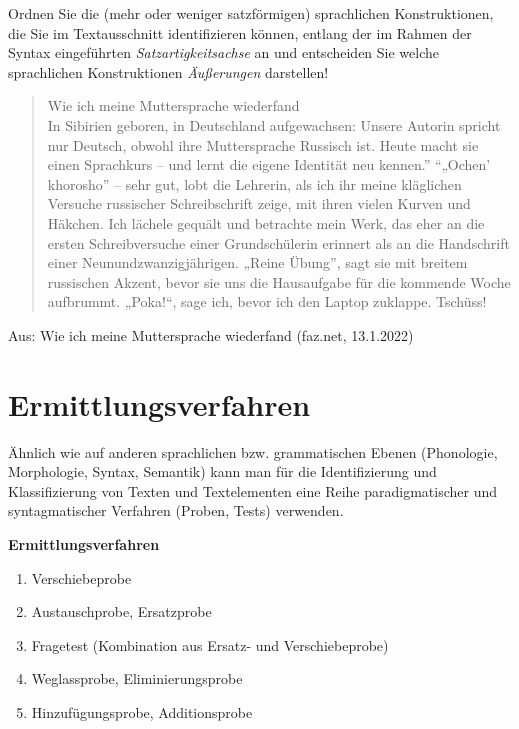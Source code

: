 \documentclass[
  letterpaper,
]{scrbook}
\providecommand{\tightlist}{%
  \setlength{\itemsep}{0pt}\setlength{\parskip}{0pt}}\usepackage{longtable,booktabs,array}
\begin{document}
Ordnen Sie die (mehr oder weniger satzförmigen) sprachlichen
Konstruktionen, die Sie im Textausschnitt identifizieren können, entlang
der im Rahmen der Syntax eingeführten \emph{Satzartigkeitsachse} an und
entscheiden Sie welche sprachlichen Konstruktionen \emph{Äußerungen}
darstellen!

\begin{quote}
Wie ich meine Muttersprache wiederfand\\
In Sibirien geboren, in Deutschland aufgewachsen: Unsere Autorin spricht
nur Deutsch, obwohl ihre Muttersprache Russisch ist. Heute macht sie
einen Sprachkurs -- und lernt die eigene Identität neu kennen.''
``„Ochen' khorosho'' -- sehr gut, lobt die Lehrerin, als ich ihr meine
kläglichen Versuche russischer Schreibschrift zeige, mit ihren vielen
Kurven und Häkchen. Ich lächele gequält und betrachte mein Werk, das
eher an die ersten Schreibversuche einer Grundschülerin erinnert als an
die Handschrift einer Neunundzwanzigjährigen. „Reine Übung'', sagt sie
mit breitem russischen Akzent, bevor sie uns die Hausaufgabe für die
kommende Woche aufbrummt. „Poka!{}``, sage ich, bevor ich den Laptop
zuklappe. Tschüss!
\end{quote}

Aus: Wie ich meine Muttersprache wiederfand (faz.net, 13.1.2022)

\hypertarget{ermittlungsverfahren}{%
\section{Ermittlungsverfahren}\label{ermittlungsverfahren}}

Ähnlich wie auf anderen sprachlichen bzw. grammatischen Ebenen
(Phonologie, Morphologie, Syntax, Semantik) kann man für die
Identifizierung und Klassifizierung von Texten und Textelementen eine
Reihe paradigmatischer und syntagmatischer Verfahren (Proben, Tests)
verwenden.

\textbf{Ermittlungsverfahren}

\begin{enumerate}
\def\labelenumi{\arabic{enumi}.}
\tightlist
\item
  Verschiebeprobe\\
\item
  Austauschprobe, Ersatzprobe\\
\item
  Fragetest (Kombination aus Ersatz- und Verschiebeprobe)\\
\item
  Weglassprobe, Eliminierungsprobe\\
\item
  Hinzufügungsprobe, Additionsprobe\\
\end{enumerate}
\end{document}
